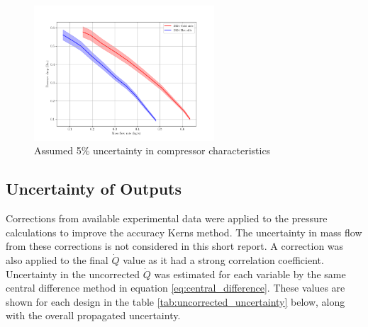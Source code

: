 \documentclass{article}
\begin{document}
\begin{figure}[H]
    \centering
    \includegraphics[width=0.6\textwidth]{compressor_characteristics.png}
    \caption{Assumed 5\% uncertainty in compressor characteristics}
    \label{fig:compressor_uncertainty}
\end{figure}

\subsection{Uncertainty of Outputs}
Corrections from available experimental data were applied to the pressure calculations to improve the accuracy Kerns method.
The uncertainty in mass flow from these corrections is not considered in this short report.
A correction was also applied to the final $\dot{Q}$ value as it had a strong correlation coefficient.
Uncertainty in the uncorrected $\dot{Q}$ was estimated for each variable by the same central difference method in equation \ref{eq:central_difference}.
These values are shown for each design in the table \ref{tab:uncorrected_uncertainty} below, along with the overall propagated uncertainty.
\end{document}
